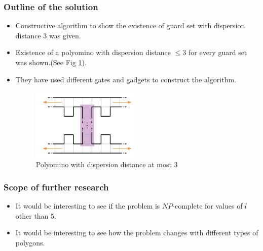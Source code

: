 \documentclass{Assignment}
\begin{document}
\subsubsection*{Outline of the solution}
\vspace{-0.3cm}
\begin{itemize}
    \itemsep-0.3em
    \item Constructive algorithm to show the existence of guard set with dispersion distance $3$ was given.
    \item Existence of a polyomino with dispersion distance $\le 3$ for every guard set was shown.(See Fig \ref{fig:dispersion_distance_3}).
    \item They have used different gates and gadgets to construct the algorithm.
    \begin{figure}[H]
        \centering
        \includegraphics[width=0.5\textwidth]{images/dispersion_distance_3.png}
        \caption{Polyomino with dispersion distance at most 3}
        \label{fig:dispersion_distance_3}
    \end{figure}
\end{itemize}
\vspace{-0.8cm}
\subsubsection*{Scope of further research}
\vspace{-0.3cm}
\begin{itemize}
    \itemsep-0.3em
    \item It would be interesting to see if the problem is $NP$-complete for values of $l$ other than 5.
    \item It would be interesting to see how the problem changes with different types of polygons.
\end{itemize}

\printbibliography
\end{document}
